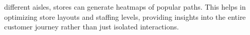 different aisles, stores can generate heatmaps of popular paths. This helps in optimizing store layouts and staffing levels, providing insights into the entire customer journey rather than just isolated interactions.
